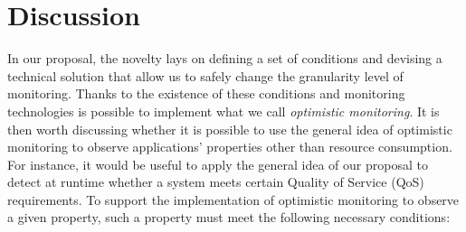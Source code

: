 \section{Discussion}\label{sec:discussion}

In our proposal, the novelty lays on defining a set of conditions and devising a technical solution that allow us to safely
change the granularity level of monitoring.
Thanks to the existence of these conditions and monitoring technologies is possible to implement what we call \textit{optimistic monitoring}.
It is then worth discussing whether it is possible to use the general idea of optimistic monitoring to observe applications' properties other than resource consumption.
For instance, it would be useful to apply the general idea of our proposal to detect at runtime whether a system meets certain Quality of Service (QoS) requirements.
To support the implementation of optimistic monitoring to observe a given property, such a property must meet the following necessary conditions:
